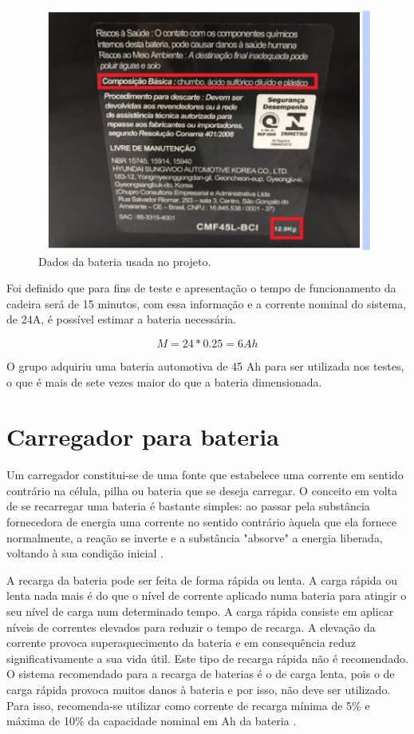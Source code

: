 \begin{figure}[h!]
  \centering
  \includegraphics{figuras/Bateria2.jpg}
  \caption{Dados da bateria usada no projeto.}
\end{figure}

Foi definido que para fins de teste e apresentação o tempo de funcionamento da
cadeira será de 15 minutos, com essa informação e a corrente nominal do
sistema, de 24A, é possível estimar a bateria necessária.

\[M = 24*0.25 = 6 Ah\]

O grupo adquiriu uma bateria automotiva de 45 Ah para ser utilizada nos testes,
o que é mais de sete vezes maior do que a bateria dimensionada.

\section{Carregador para bateria}

 Um carregador constitui-se de uma fonte que estabelece uma corrente em sentido
 contrário na célula, pilha ou bateria que se deseja carregar. O conceito em
 volta de se recarregar uma bateria é bastante simples: ao passar pela
 substância fornecedora de energia uma corrente no sentido contrário àquela que
 ela fornece normalmente, a reação se inverte e a substância "absorve" a
 energia liberada, voltando à sua condição inicial \cite{bahiadesenvolvimento}.

A recarga da bateria pode ser feita de forma rápida ou lenta. A carga rápida ou
lenta nada mais é do que o nível de corrente aplicado numa bateria para atingir
o seu nível de carga num determinado tempo. A carga rápida consiste em aplicar
níveis de correntes elevados para reduzir o tempo de recarga. A elevação da
corrente provoca superaquecimento da bateria e em consequência reduz
significativamente a sua vida útil. Este tipo de recarga rápida não é
recomendado. O sistema recomendado para a recarga de baterias é o de carga
lenta, pois o de carga rápida provoca muitos danos à bateria e por isso, não
deve ser utilizado. Para isso, recomenda-se utilizar como corrente de recarga
mínima de 5\% e máxima de 10\% da capacidade nominal em Ah da bateria
\cite{soares2012sistema}.


